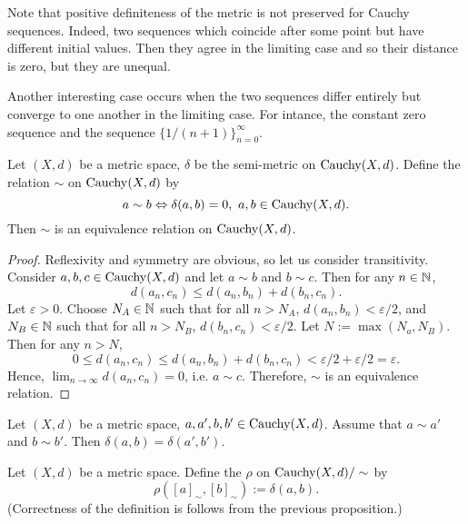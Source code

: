 \begin{remark}
  Note that positive definiteness of the metric is not preserved for Cauchy
  sequences.
  Indeed, two sequences which coincide after some point but have different
  initial values.
  Then they agree in the limiting case and so their distance is zero,
  but they are unequal.

  Another interesting case occurs when the two sequences differ entirely but
  converge to one another in the limiting case.
  For intance, the constant zero sequence and the sequence
  $\{1 / (n + 1)\}_{n = 0}^\infty$.
\end{remark}
\begin{proposition}
  Let
    $(X, d)$ be a metric space,
    $\delta$ be the semi-metric on $\mathop{\rm Cauchy}\nolimits(X, d)$.
  Define the relation $\sim$ on $\mathop{\rm Cauchy}\nolimits(X, d)$ by
  \begin{equation}
    a \sim b \Leftrightarrow \delta(a, b) = 0,\
    a, b \in \mathop{\rm Cauchy}\nolimits(X, d).
  \end{equation}
  Then $\sim$ is an equivalence relation on $\mathop{\rm Cauchy}\nolimits(X, d)$.
\end{proposition}
\begin{proof}
  Reflexivity and symmetry are obvious, so let us consider transitivity.
  Consider $a, b, c \in \mathop{\rm Cauchy}\nolimits(X, d)$ and let
  $a \sim b$ and $b \sim c$.
  Then for any $n \in \mathbb{N}$,
  \begin{equation}
    d(a_n, c_n) \leq d(a_n, b_n) + d(b_n, c_n).
  \end{equation}
  Let $\varepsilon > 0$.
  Choose
  $N_A \in \mathbb{N}$ such that for all $n > N_A$, $d(a_n, b_n) < \varepsilon / 2$, and
  $N_B \in \mathbb{N}$ such that for all $n > N_B$, $d(b_n, c_n) < \varepsilon / 2$.
  Let $N := \max(N_a, N_B)$.
  Then for any $n > N$,
  \begin{equation}
    0
    \leq d(a_n, c_n)
    \leq d(a_n, b_n) + d(b_n, c_n)
    < \varepsilon / 2 + \varepsilon / 2
    = \varepsilon.
  \end{equation}
  Hence, $\lim_{n \to \infty} d(a_n, c_n) = 0$, i.e. $a \sim c$.
  Therefore, $\sim$ is an equivalence relation.
\end{proof}
\begin{proposition}
  Let $(X, d)$ be a metric space, $a, a', b, b' \in \mathop{\rm Cauchy}\nolimits(X, d)$.
  Assume that $a \sim a'$ and $b \sim b'$.
  Then $\delta(a, b) = \delta(a', b')$.
\end{proposition}
\begin{definition}
  Let $(X, d)$ be a metric space.
  Define the $\rho$ on $\mathop{\rm Cauchy}\nolimits(X, d) / \sim$ by
  \begin{equation}
    \rho([a]_\sim, [b]_\sim) := \delta(a, b).
  \end{equation}
  (Correctness of the definition is follows from the previous proposition.)
\end{definition}
